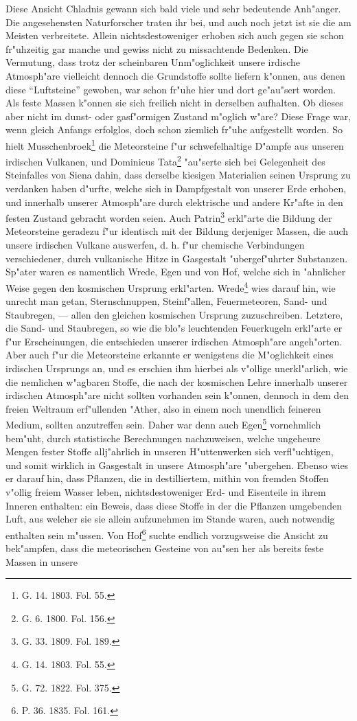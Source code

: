\documentclass[a4paper, 8pt, oneside, polutonikogreek, german]{article}
\begin{document}
Diese Ansicht Chladnis gewann sich bald viele und sehr bedeutende Anh"anger. Die angesehensten Naturforscher traten ihr bei, und auch noch jetzt ist sie die am Meisten verbreitete. Allein nichtsdestoweniger erhoben sich auch gegen sie schon fr"uhzeitig gar manche und gewiss nicht zu missachtende Bedenken. Die Vermutung, dass trotz der scheinbaren Unm"oglichkeit unsere irdische Atmosph"are vielleicht dennoch die Grundstoffe sollte liefern k"onnen, aus denen diese "`Luftsteine"' gewoben, war schon fr"uhe hier und dort ge"au"sert worden. Als feste Massen k"onnen sie sich freilich nicht in derselben aufhalten. Ob dieses aber nicht im dunst- oder gasf"ormigen Zustand m"oglich w"are? Diese Frage war, wenn gleich Anfangs erfolglos, doch schon ziemlich fr"uhe aufgestellt worden. So hielt Musschenbroek\footnote{G. 14. 1803. Fol. 55.} die Meteorsteine f"ur schwefelhaltige D"ampfe aus unseren irdischen Vulkanen, und Dominicus Tata\footnote{G. 6. 1800. Fol. 156.} "au"serte sich bei Gelegenheit des Steinfalles von Siena dahin, dass derselbe kiesigen Materialien seinen Ursprung zu verdanken haben d"urfte, welche sich in Dampfgestalt von unserer Erde erhoben, und innerhalb unserer Atmosph"are durch elektrische und andere Kr"afte in den festen Zustand gebracht worden seien. Auch Patrin\footnote{G. 33. 1809. Fol. 189.} erkl"arte die Bildung der Meteorsteine geradezu f"ur identisch mit der Bildung derjeniger Massen, die auch unsere irdischen Vulkane auswerfen, d. h. f"ur chemische Verbindungen verschiedener, durch vulkanische Hitze in Gasgestalt "ubergef"uhrter Substanzen. Sp"ater waren es namentlich Wrede, Egen und von Hof, welche sich in "ahnlicher Weise gegen den kosmischen Ursprung erkl"arten. Wrede\footnote{G. 14. 1803. Fol. 55.} wies darauf hin, wie unrecht man getan, Sternschnuppen, Steinf"allen, Feuermeteoren, Sand- und Staubregen, --- allen den gleichen kosmischen Ursprung zuzuschreiben. Letztere, die Sand- und Staubregen, so wie die blo"s leuchtenden Feuerkugeln erkl"arte er f"ur Erscheinungen, die entschieden unserer irdischen Atmosph"are angeh"orten. Aber auch f"ur die Meteorsteine erkannte er wenigstens die M"oglichkeit eines irdischen Ursprungs an, und es erschien ihm hierbei als v"ollige unerkl"arlich, wie die nemlichen w"agbaren Stoffe, die nach der kosmischen Lehre innerhalb unserer irdischen Atmosph"are nicht sollten vorhanden sein k"onnen, dennoch in dem den freien Weltraum erf"ullenden "Ather, also in einem noch unendlich feineren Medium, sollten anzutreffen sein. Daher war denn auch Egen\footnote{G. 72. 1822. Fol. 375.} vornehmlich bem"uht, durch statistische Berechnungen nachzuweisen, welche ungeheure Mengen fester Stoffe allj"ahrlich in unseren H"uttenwerken sich verfl"uchtigen, und somit wirklich in Gasgestalt in unsere Atmosph"are "ubergehen. Ebenso wies er darauf hin, dass Pflanzen, die in destilliertem, mithin von fremden Stoffen v"ollig freiem Wasser leben, nichtsdestoweniger Erd- und Eisenteile in ihrem Inneren enthalten: ein Beweis, dass diese Stoffe in der die Pflanzen umgebenden Luft, aus welcher sie sie allein aufzunehmen im Stande waren, auch notwendig enthalten sein m"ussen. Von Hof\footnote{P. 36. 1835. Fol. 161.} suchte endlich vorzugsweise die Ansicht zu bek"ampfen, dass die meteorischen Gesteine von au"sen her als bereits feste Massen in unsere 
\end{document}
